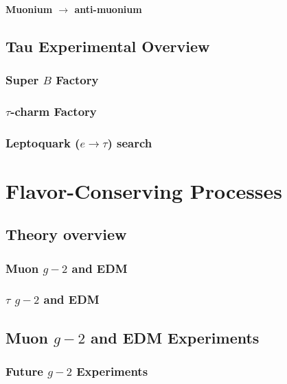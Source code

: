 \paragraph{Muonium $\to$ anti-muonium}

\subsection{Tau Experimental Overview}\label{sec:cl:tauexp}


\subsubsection{Super $B$ Factory}

\subsubsection{$\tau$-charm Factory}

\subsubsection{Leptoquark ($e \to \tau$) search}

\section{Flavor-Conserving Processes}\label{sec:cl:fcp}

\subsection{Theory overview}\label{sec:cl:fct}

\subsubsection{Muon $g-2$ and EDM}

\subsubsection{$\tau$ $g-2$ and EDM}

\subsection{Muon $g-2$ and EDM Experiments}\label{sec:cl:g-2exp}


\subsubsection{Future $g-2$ Experiments}

